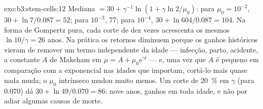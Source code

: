 \begin{solution}{exo:b3:stem-cells:12}
Mediana $= 30 + \gamma^{-1}\ln(1 + \gamma\ln 2/\mu_{0})$: para $\mu_{0} =
10^{-2}$, $30 + \ln 7/0.087 = 52$; para $10^{-3}$, 77; para $10^{-4}$,
$30 +
\ln 604/0.087 = 104$. Na forma de Gompertz pura, cada corte de dez
vezes acrescenta os mesmos $\ln 10/\gamma = 26$ anos. Na prática os
retornos diminuem porque os ganhos históricos vieram de remover um termo
independente da idade --- infecção, parto, acidente, a constante $A$ de
Makeham em $\mu = A
+ \mu_{0}\mathrm{e}^{\gamma t}$ --- e, uma vez que $A$
é pequeno em comparação com a exponencial nas idades que importam,
cortá-lo mais quase nada muda; o $\mu_{0}$ intrínseco mudou muito menos.
Um corte de \qty{20}{\%} em $\gamma$ (para $0.070$) dá $30 + \ln 49/0.070 = 86$: nove anos, ganhos em toda idade, e não por adiar algumas
causas de morte.
\end{solution}

